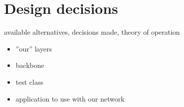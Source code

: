 \chapter{Design decisions}
available alternatives, decisions made, theory of operation
\begin{itemize}
\item ''our'' layers	
\item backbone
\item test class
\item application to use with our network
\end{itemize}
